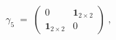 \begin{equation}\label{eq:defgamma5}
\gamma_5 \;=\; \left( \begin{array}{cc}
                   0     &    {\mathbf 1}_{2\times 2} \\
                 {\mathbf 1}_{2\times 2} &      0
                      \end{array} \right) \;,
\end{equation} 
